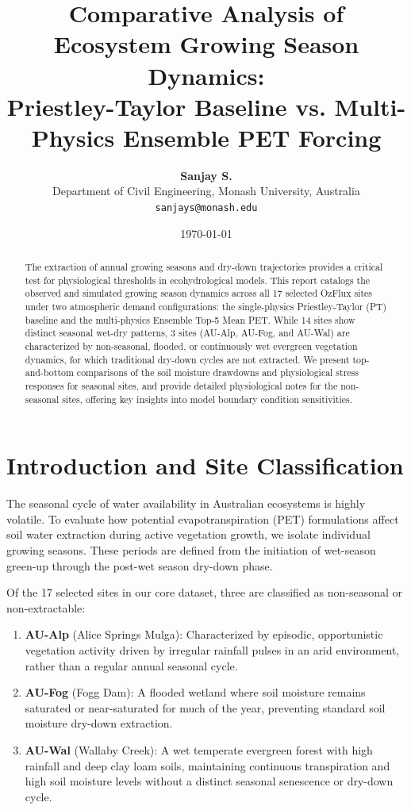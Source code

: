 \documentclass[11pt,a4paper]{article}
\title{\textbf{Comparative Analysis of Ecosystem Growing Season Dynamics:\\ Priestley-Taylor Baseline vs. Multi-Physics Ensemble PET Forcing}}
\author{\textbf{Sanjay S.} \\ Department of Civil Engineering, Monash University, Australia \\ \texttt{sanjays@monash.edu}}
\date{\today}
\begin{document}
\maketitle

\begin{abstract}
The extraction of annual growing seasons and dry-down trajectories provides a critical test for physiological thresholds in ecohydrological models. This report catalogs the observed and simulated growing season dynamics across all 17 selected OzFlux sites under two atmospheric demand configurations: the single-physics Priestley-Taylor (PT) baseline and the multi-physics Ensemble Top-5 Mean PET. While 14 sites show distinct seasonal wet-dry patterns, 3 sites (AU-Alp, AU-Fog, and AU-Wal) are characterized by non-seasonal, flooded, or continuously wet evergreen vegetation dynamics, for which traditional dry-down cycles are not extracted. We present top-and-bottom comparisons of the soil moisture drawdowns and physiological stress responses for seasonal sites, and provide detailed physiological notes for the non-seasonal sites, offering key insights into model boundary condition sensitivities.
\end{abstract}

\section{Introduction and Site Classification}
The seasonal cycle of water availability in Australian ecosystems is highly volatile. To evaluate how potential evapotranspiration (PET) formulations affect soil water extraction during active vegetation growth, we isolate individual growing seasons. These periods are defined from the initiation of wet-season green-up through the post-wet season dry-down phase.

Of the 17 selected sites in our core dataset, three are classified as non-seasonal or non-extractable:
\begin{enumerate}
    \item \textbf{AU-Alp} (Alice Springs Mulga): Characterized by episodic, opportunistic vegetation activity driven by irregular rainfall pulses in an arid environment, rather than a regular annual seasonal cycle.
    \item \textbf{AU-Fog} (Fogg Dam): A flooded wetland where soil moisture remains saturated or near-saturated for much of the year, preventing standard soil moisture dry-down extraction.
    \item \textbf{AU-Wal} (Wallaby Creek): A wet temperate evergreen forest with high rainfall and deep clay loam soils, maintaining continuous transpiration and high soil moisture levels without a distinct seasonal senescence or dry-down cycle.
\end{enumerate}
\end{document}
